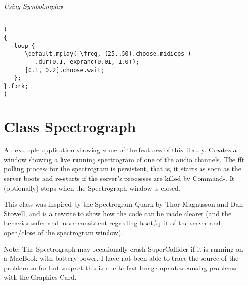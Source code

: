 \documentclass[11pt, a4paper]{scrartcl}
\begin{document}
\emph{Using Symbol:mplay}

\begin{verbatim}

(
{
   loop {
      \default.mplay([\freq, (25..50).choose.midicps])
         .dur(0.1, exprand(0.01, 1.0));
      [0.1, 0.2].choose.wait;
   };
}.fork;
)
\end{verbatim}
\section*{Class Spectrograph}
\label{sec-16}


An example application showing some of the features of this library. Creates a window showing a live running spectrogram of one of the audio channels. The fft polling process for the spectrogram is persistent, that is, it starts as soon as the server boots and re-starts if the server's processes are killed by Command-. It (optionally) stops when the Spectrograph window is closed. 

This class was inspired by the Spectrogram Quark by Thor Magnusson and Dan Stowell, and is a rewrite to show how the code can be made clearer (and the behavior safer and more consistent regarding boot/quit of the server and open/close of the spectrogram window). 

Note: The Spectrograph may occasionally crash SuperCollider if it is running on a MacBook with battery power. I have not been able to trace the source of the problem so far but suspect this is due to fast Image updates causing problems with the Graphics Card.
\end{document}

